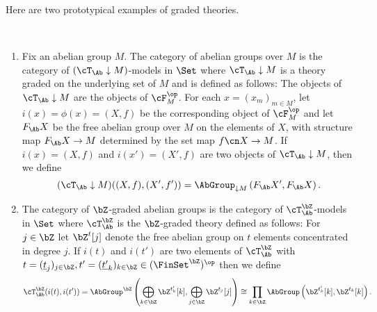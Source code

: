 \documentclass[leqno,oneside,english]{elsarticle}
\begin{document}
{{\ifshowsaveblocks
{}
\fi}}{}

Here are two prototypical examples of graded theories.
\begin{example}\ 
  \label{ex:graded-theories}
  \begin{enumerate}
    \item Fix an abelian group $M$. The category of abelian groups
      over $M$ is the category of $(\cT_{\Ab}\downarrow M)$-models in
      $\Set$ where $\cT_{\Ab}\downarrow M$ is a theory graded on the
      underlying set of $M$ and is defined as follows: The objects of
      $\cT_{\Ab}\downarrow M$ are the objects of $\cF_M^{\op}$.  For each $x =
      (x_m)_{m \in M}$, let $i(x) = \phi(x) = (X,f)$ be the corresponding
      object of $\cF_M^{\op}$ and let $F_{\Ab}X$ be the free abelian group
      over $M$ on the elements of $X$, with structure map $F_{\Ab}X \to
      M$ determined by the set map $f\cn X \to M$. 
      If $i(x) = (X,f)$ and $i(x') = (X',f)$ are two objects of $\cT_{\Ab}\downarrow M$, then we define
      \[
      (\cT_{\Ab}\downarrow M)((X,f), (X',f')) = 
      \AbGroup_{\downarrow M}\left(
        F_{\Ab}X', 
        F_{\Ab}X
      \right). 
      \]
  \item The category of $\bZ$-graded abelian groups is the category of
    $\cT^{\bZ}_{\Ab}$-models in $\Set$ where $\cT_{\Ab}^{\bZ}$ is the
    $\bZ$-graded theory defined as follows: For $j \in \bZ$ let
    $\bZ^{t}[j]$ denote the free abelian group on $t$ elements
    concentrated in degree $j$. If $i(t)$ and $i(t')$ are two
    elements of $\cT^{\bZ}_{\Ab}$ with $t  = (\underline{t}_j)_{j \in \bZ}, t' = (\underline{t'}_{k})_{k\in \bZ}\in (\FinSet^\bZ)^\op$ then we define  \[
    \cT^{\bZ}_{\Ab}(i(t), i(t')) = \AbGroup^{\bZ}\left(\bigoplus_{k\in
      \bZ}\bZ^{t^{\prime}_{k}}[k], \bigoplus_{j\in \bZ}
      \bZ^{t_j}[j]\right)\cong\prod_{k\in \bZ}\AbGroup\left(
      \bZ^{t^{\prime}_{k}}[k], \bZ^{t_k}[k]\right).
    \] 

  
  
  \end{enumerate}
\end{example}
\end{document}
